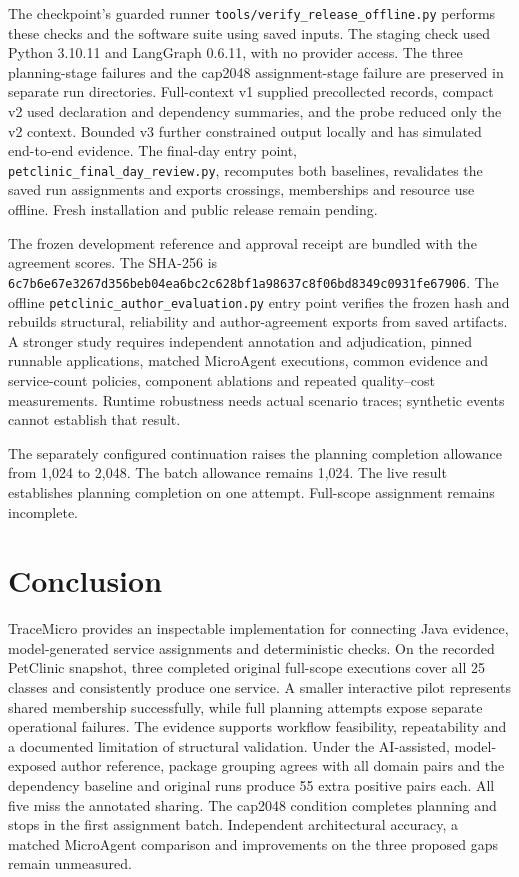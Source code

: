 The checkpoint's guarded runner \texttt{tools/\allowbreak{}verify\_\allowbreak{}release\_\allowbreak{}offline.\allowbreak{}py} performs these checks and the software suite using saved inputs. The staging check used Python 3.10.11 and LangGraph 0.6.11, with no provider access. The three planning-stage failures and the cap2048 assignment-stage failure are preserved in separate run directories. Full-context v1 supplied precollected records, compact v2 used declaration and dependency summaries, and the probe reduced only the v2 context. Bounded v3 further constrained output locally and has simulated end-to-end evidence. The final-day entry point, \texttt{petclinic\_\allowbreak{}final\_\allowbreak{}day\_\allowbreak{}review.\allowbreak{}py}, recomputes both baselines, revalidates the saved run assignments and exports crossings, memberships and resource use offline. Fresh installation and public release remain pending.

The frozen development reference and approval receipt are bundled with the agreement scores. The SHA-256 is \texttt{6c7b6e67e3267d35\allowbreak{}6beb04ea6bc2c628\allowbreak{}bf1a98637c8f06bd\allowbreak{}8349c0931fe67906}. The offline \texttt{petclinic\_\allowbreak{}author\_\allowbreak{}evaluation.\allowbreak{}py} entry point verifies the frozen hash and rebuilds structural, reliability and author-agreement exports from saved artifacts. A stronger study requires independent annotation and adjudication, pinned runnable applications, matched MicroAgent executions, common evidence and service-count policies, component ablations and repeated quality--cost measurements. Runtime robustness needs actual scenario traces; synthetic events cannot establish that result.

The separately configured continuation raises the planning completion allowance from 1,024 to 2,048. The batch allowance remains 1,024. The live result establishes planning completion on one attempt. Full-scope assignment remains incomplete.

\section{Conclusion}

TraceMicro provides an inspectable implementation for connecting Java evidence, model-generated service assignments and deterministic checks. On the recorded PetClinic snapshot, three completed original full-scope executions cover all 25 classes and consistently produce one service. A smaller interactive pilot represents shared membership successfully, while full planning attempts expose separate operational failures. The evidence supports workflow feasibility, repeatability and a documented limitation of structural validation. Under the AI-assisted, model-exposed author reference, package grouping agrees with all domain pairs and the dependency baseline and original runs produce 55 extra positive pairs each. All five miss the annotated sharing. The cap2048 condition completes planning and stops in the first assignment batch. Independent architectural accuracy, a matched MicroAgent comparison and improvements on the three proposed gaps remain unmeasured.

